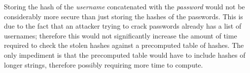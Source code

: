 \documentclass[../CryptoHW3.tex]{subfiles}
\begin{document}
\begin{flushleft}



 Storing the hash of the \emph{username} concatenated with the \emph{password} would not be considerably more secure than just storing the hashes of the passwords.  This is due to the fact that an attacker trying to crack passwords already has a list of usernames; therefore this would not significantly increase the amount of time required to check the stolen hashes against a precomputed table of hashes.  The only impediment is that the precomputed table would have to include hashes of longer strings, therefore possibly requiring more time to compute.



\end{flushleft}
\end{document}

